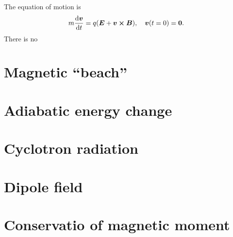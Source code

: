 \documentclass[11pt,a4paper, 
english, swedish %
]{article}
\begin{document}
The equation of motion is
\begin{equation}
m\dv{\vb*v}{t} = q\qty(\vb*E + \vb*v\cross\vb*B)
\qc \vb*v(t=0) = \vb*0.
\end{equation}
There is no 


\section{Magnetic ``beach''}


\section{Adiabatic energy change}


\section{Cyclotron radiation}


\section{Dipole field}



\section{Conservatio of magnetic moment}




\end{document}
